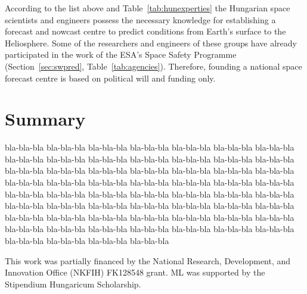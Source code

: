 \documentclass[sn-aps]{sn-jnl}%
\begin{document}
According to the list above and Table~\ref{tab:hunexperties} the Hungarian space scientists and engineers possess the necessary knowledge for establishing a forecast and nowcast centre to predict conditions from Earth's surface to the Heliosphere. Some of the researchers and engineers of these groups have already participated in the work of the ESA's Space Safety Programme (Section~\ref{sec:swpred}, Table~\ref{tab:agencies}). Therefore, founding a national space forecast centre is based on political will and funding only. 

\section{Summary}
\label{sec:sum}




bla-bla-bla bla-bla-bla bla-bla-bla bla-bla-bla bla-bla-bla bla-bla-bla bla-bla-bla bla-bla-bla bla-bla-bla bla-bla-bla bla-bla-bla bla-bla-bla bla-bla-bla bla-bla-bla bla-bla-bla bla-bla-bla bla-bla-bla bla-bla-bla bla-bla-bla bla-bla-bla bla-bla-bla bla-bla-bla bla-bla-bla bla-bla-bla bla-bla-bla bla-bla-bla bla-bla-bla bla-bla-bla bla-bla-bla bla-bla-bla bla-bla-bla bla-bla-bla bla-bla-bla bla-bla-bla bla-bla-bla bla-bla-bla bla-bla-bla bla-bla-bla bla-bla-bla bla-bla-bla bla-bla-bla bla-bla-bla bla-bla-bla bla-bla-bla bla-bla-bla bla-bla-bla bla-bla-bla bla-bla-bla bla-bla-bla bla-bla-bla bla-bla-bla bla-bla-bla bla-bla-bla bla-bla-bla bla-bla-bla bla-bla-bla bla-bla-bla bla-bla-bla bla-bla-bla bla-bla-bla





\backmatter


This work was partially financed by the National Research, Development, and Innovation Office (NKFIH) FK128548 grant. ML was supported by the Stipendium Hungaricum Scholarship. 

\vfill


\pagebreak

%


\end{document}
